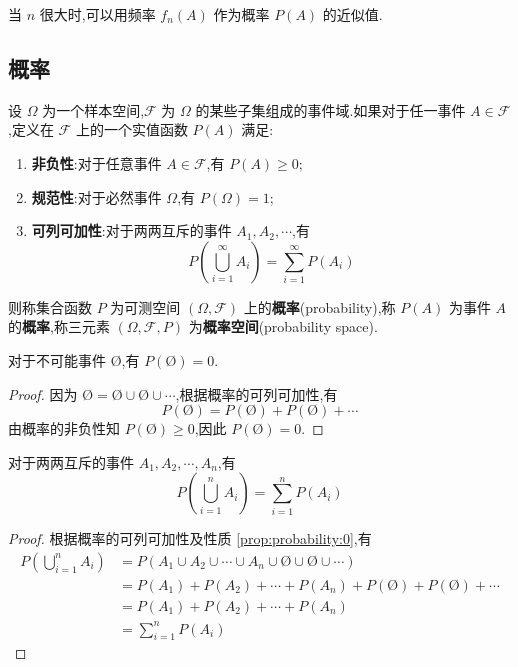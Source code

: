 当 $n$ 很大时,可以用频率 $f_n(A)$ 作为概率 $P(A)$ 的近似值.

\subsection{概率}

\begin{definition}
    \indent 设 $\varOmega$ 为一个样本空间,$\mathcal{F}$ 为 $\varOmega$ 的某些子集组成的事件域.如果对于任一事件 $A \in \mathcal{F}$,定义在 $\mathcal{F}$ 上的一个实值函数 $P(A)$ 满足:
    \begin{enumerate}
        \item \textbf{非负性}:对于任意事件 $A \in \mathcal{F}$,有 $P(A) \geqslant 0$;
        \item \textbf{规范性}:对于必然事件 $\varOmega$,有 $P(\varOmega)=1$;
        \item \textbf{可列可加性}:对于两两互斥的事件 $A_1,A_2,\cdots$,有
        $$
        P \left(\bigcup_{i=1}^\infty A_i \right) = \sum_{i=1}^\infty P(A_i)
        $$
    \end{enumerate}
    则称集合函数 $P$ 为可测空间 $(\varOmega, \mathcal{F})$ 上的\textbf{概率}(probability),称 $P(A)$ 为事件 $A$ 的\textbf{概率},称三元素 $(\varOmega, \mathcal{F}, P)$ 为\textbf{概率空间}(probability space).
\end{definition}

\begin{property}
    \indent 对于不可能事件 $\text{\O}$,有 $P(\text{\O})=0$.
\end{property}

\begin{proof}
    因为 $\text{\O} = \text{\O} \cup \text{\O} \cup \cdots$,根据概率的可列可加性,有
    $$
    P(\text{\O}) = P(\text{\O}) + P(\text{\O}) + \cdots
    $$
    由概率的非负性知 $P(\text{\O}) \geqslant 0$,因此 $P(\text{\O})=0$.
\end{proof}

\begin{property}
    \indent 对于两两互斥的事件 $A_1,A_2,\cdots,A_n$,有
    \begin{equation}
        P \left(\bigcup_{i=1}^n A_i \right) = \sum_{i=1}^n P(A_i)
    \end{equation}
\end{property}

\begin{proof}
    根据概率的可列可加性及性质 \ref{prop:probability:0},有
    $$
    \begin{aligned}
        P \left(\bigcup_{i=1}^n A_i \right) &= P(A_1 \cup A_2 \cup \cdots \cup A_n \cup \text{\O} \cup \text{\O} \cup \cdots) \\
        &= P(A_1) + P(A_2) + \cdots + P(A_n) + P(\text{\O}) + P(\text{\O}) + \cdots \\
        &= P(A_1) + P(A_2) + \cdots + P(A_n) \\
        &= \sum_{i=1}^n P(A_i)
    \end{aligned}
    $$
\end{proof}

